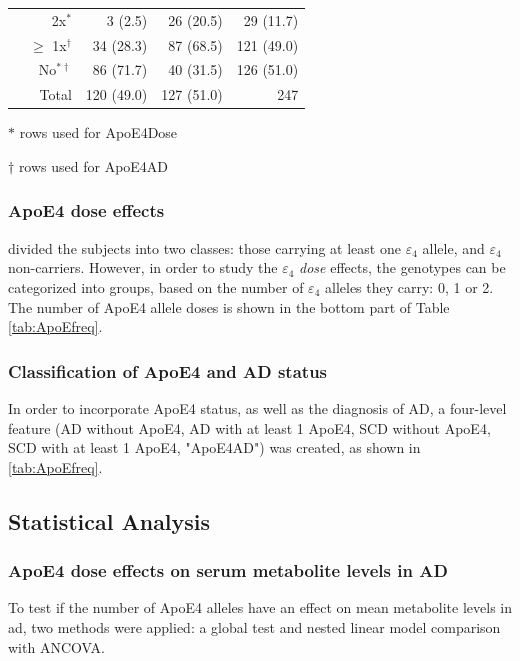 \documentclass{amsart}
\begin{document}
\begin{table}
\begin{threeparttable}
\begin{tabular}{crrrr}
                                        & 2x$^\ast$            & 3 (2.5)    & 26 (20.5)  & 29 (11.7)   \\
                                        & $\geq$ 1x$ ^\dagger$ & 34 (28.3)  & 87 (68.5)  & 121 (49.0)  \\
                                        & No$^{\ast\dagger}$     & 86 (71.7)  & 40 (31.5)  & 126 (51.0)  \\ \midrule
    \multicolumn{2}{r}{Total}                                                & 120 (49.0)       & 127 (51.0)       & 247         \\ \bottomrule
  \end{tabular}
  \begin{tablenotes}
    \item[$\ast$] rows used for ApoE4Dose
    \item[$\dagger$] rows used for ApoE4AD 
  \end{tablenotes}
\end{threeparttable}
\end{table}

\subsubsection*{ApoE4 dose effects}
\citeauthor{deLeeuw2017Blood-basedDisease} divided the subjects into two classes: those carrying at least one $\varepsilon_4$ allele, and $\varepsilon_4$ non-carriers. However, in order to study the $\varepsilon_4$ \textit{dose} effects, the genotypes can be categorized into groups, based on the number of $\varepsilon_4$ alleles they carry: 0, 1 or 2. The number of ApoE4 allele doses is shown in the bottom part of Table \ref{tab:ApoEfreq}.

\subsubsection*{Classification of ApoE4 and AD status}
In order to incorporate ApoE4 status, as well as the diagnosis of AD, a four-level feature (AD without ApoE4, AD with at least 1 ApoE4, SCD without ApoE4, SCD with at least 1 ApoE4, "ApoE4AD") was created, as shown in \ref{tab:ApoEfreq}.

\subsection{Statistical Analysis} \label{stats}
\subsubsection{ApoE4 dose effects on serum metabolite levels in AD} \label{rq1}
To test if the number of ApoE4 alleles have an effect on mean metabolite levels in \acrshort{ad}, two methods were applied: a global test and nested linear model comparison with ANCOVA.
\end{document}
